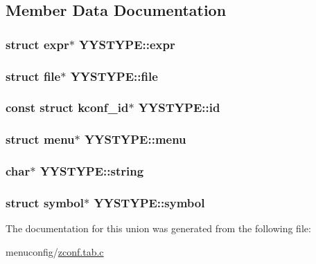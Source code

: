 \subsection{Member Data Documentation}
\hypertarget{unionYYSTYPE_a1c6524a101e4f9210f47379f7a2ecda0}{
\subsubsection[{expr}]{\setlength{\rightskip}{0pt plus 5cm}struct {\bf expr}$\ast$ Y\-Y\-S\-T\-Y\-P\-E\-::expr}}\label{unionYYSTYPE_a1c6524a101e4f9210f47379f7a2ecda0}
\hypertarget{unionYYSTYPE_a8bae8ffa75c8b07b528c4fe5de2401b4}{
\subsubsection[{file}]{\setlength{\rightskip}{0pt plus 5cm}struct {\bf file}$\ast$ Y\-Y\-S\-T\-Y\-P\-E\-::file}}\label{unionYYSTYPE_a8bae8ffa75c8b07b528c4fe5de2401b4}
\hypertarget{unionYYSTYPE_a0f17c44301ab57aaa56b1028c0d97ee5}{
\subsubsection[{id}]{\setlength{\rightskip}{0pt plus 5cm}const struct {\bf kconf\-\_\-id}$\ast$ Y\-Y\-S\-T\-Y\-P\-E\-::id}}\label{unionYYSTYPE_a0f17c44301ab57aaa56b1028c0d97ee5}
\hypertarget{unionYYSTYPE_a89d39a530f417ec6fdf6bf0ed149e249}{
\subsubsection[{menu}]{\setlength{\rightskip}{0pt plus 5cm}struct {\bf menu}$\ast$ Y\-Y\-S\-T\-Y\-P\-E\-::menu}}\label{unionYYSTYPE_a89d39a530f417ec6fdf6bf0ed149e249}
\hypertarget{unionYYSTYPE_ae8767f4b426d2a2575573f567e8a142b}{
\subsubsection[{string}]{\setlength{\rightskip}{0pt plus 5cm}char$\ast$ Y\-Y\-S\-T\-Y\-P\-E\-::string}}\label{unionYYSTYPE_ae8767f4b426d2a2575573f567e8a142b}
\hypertarget{unionYYSTYPE_a72913aac271333edb4f145ef15fc1779}{
\subsubsection[{symbol}]{\setlength{\rightskip}{0pt plus 5cm}struct {\bf symbol}$\ast$ Y\-Y\-S\-T\-Y\-P\-E\-::symbol}}\label{unionYYSTYPE_a72913aac271333edb4f145ef15fc1779}


The documentation for this union was generated from the following file\-:\begin{DoxyCompactItemize}
\item 
menuconfig/\hyperlink{zconf_8tab_8c}{zconf.\-tab.\-c}\end{DoxyCompactItemize}
